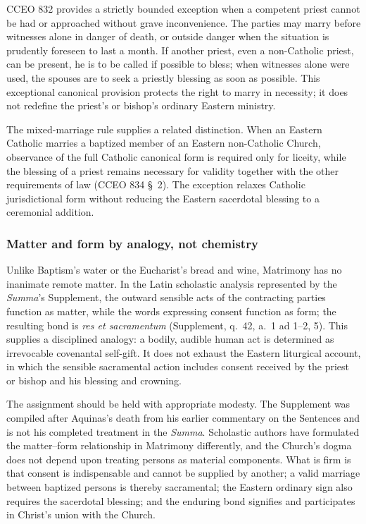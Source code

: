 CCEO 832 provides a strictly bounded exception when a competent priest cannot be had or approached without grave inconvenience. The parties may marry before witnesses alone in danger of death, or outside danger when the situation is prudently foreseen to last a month. If another priest, even a non-Catholic priest, can be present, he is to be called if possible to bless; when witnesses alone were used, the spouses are to seek a priestly blessing as soon as possible. This exceptional canonical provision protects the right to marry in necessity; it does not redefine the priest's or bishop's ordinary Eastern ministry.

The mixed-marriage rule supplies a related distinction. When an Eastern Catholic marries a baptized member of an Eastern non-Catholic Church, observance of the full Catholic canonical form is required only for liceity, while the blessing of a priest remains necessary for validity together with the other requirements of law (CCEO 834 \S~2). The exception relaxes Catholic jurisdictional form without reducing the Eastern sacerdotal blessing to a ceremonial addition.

\subsubsection{Matter and form by analogy, not chemistry}

Unlike Baptism's water or the Eucharist's bread and wine, Matrimony has no inanimate remote matter. In the Latin scholastic analysis represented by the \emph{Summa}'s Supplement, the outward sensible acts of the contracting parties function as matter, while the words expressing consent function as form; the resulting bond is \emph{res et sacramentum} (Supplement, q.~42, a.~1 ad 1--2, 5). This supplies a disciplined analogy: a bodily, audible human act is determined as irrevocable covenantal self-gift. It does not exhaust the Eastern liturgical account, in which the sensible sacramental action includes consent received by the priest or bishop and his blessing and crowning.

The assignment should be held with appropriate modesty. The Supplement was compiled after Aquinas's death from his earlier commentary on the Sentences and is not his completed treatment in the \emph{Summa}. Scholastic authors have formulated the matter--form relationship in Matrimony differently, and the Church's dogma does not depend upon treating persons as material components. What is firm is that consent is indispensable and cannot be supplied by another; a valid marriage between baptized persons is thereby sacramental; the Eastern ordinary sign also requires the sacerdotal blessing; and the enduring bond signifies and participates in Christ's union with the Church.

